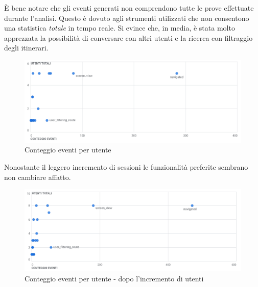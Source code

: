 \documentclass{natourDoc}
\begin{document}
È bene notare che gli eventi generati non comprendono tutte le prove effettuate durante l'analisi.
Questo è dovuto agli strumenti utilizzati che non consentono una statistica \textit{totale} in tempo reale.
Si evince che, in media, è stata molto apprezzata la possibilità di conversare con altri utenti
e la ricerca con filtraggio degli itinerari.
\begin{figure}[!htbp]
	\centering
	\includegraphics[width=\textwidth]{./analytics/utenti-eventi-grafico.png}
	\caption{Conteggio eventi per utente}
\end{figure}
\FloatBarrier

Nonostante il leggero incremento di sessioni le funzionalità preferite sembrano
non cambiare affatto.
\begin{figure}[!htbp]
	\centering
	\includegraphics[width=\textwidth]{./analytics/utenti-eventi-grafico2.png}
	\caption{Conteggio eventi per utente - dopo l'incremento di utenti}
\end{figure}
\FloatBarrier
\end{document}

